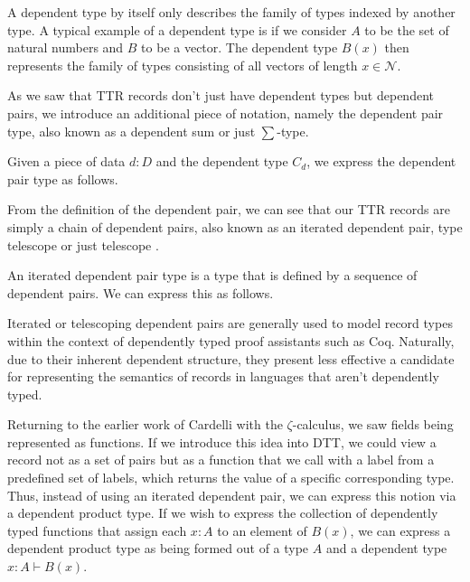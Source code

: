 A dependent type by itself only describes the family of types indexed by another type. A typical example of a dependent type is if we consider $A$ to be the set of natural numbers and $B$ to be a vector. The dependent type $B(x)$ then represents the family of types consisting of all vectors of length $x\in \mathcal N$. 

As we saw that TTR records don't just have dependent types but dependent pairs, we introduce an additional piece of notation, namely the dependent pair type, also known as a dependent sum or just $\sum$-type.

\begin{definition}
 Given a piece of data $d : D$ and the dependent type $C_d$, we express the dependent pair type as follows.
   
\end{definition}

From the definition of the dependent pair, we can see that our TTR records are simply a chain of dependent pairs, also known as an iterated dependent pair, type telescope or just telescope \cite{zucker1975automath, debruijn1991telescopic}.

\begin{definition}
 An iterated dependent pair type is a type that is defined by a sequence of dependent pairs. We can express this as follows.
  
  
  
 Iterated or telescoping dependent pairs are generally used to model record types within the context of dependently typed proof assistants such as Coq. Naturally, due to their inherent dependent structure, they present less effective a candidate for representing the semantics of records in languages that aren't dependently typed.  
\end{definition}

Returning to the earlier work of Cardelli with the $\zeta$-calculus, we saw fields being represented as functions. If we introduce this idea into DTT, we could view a record not as a set of pairs but as a function that we call with a label from a predefined set of labels, which returns the value of a specific corresponding type. Thus, instead of using an iterated dependent pair, we can express this notion via a dependent product type. If we wish to express the collection of dependently typed functions that assign each $x : A$ to an element of $B(x)$, we can express a dependent product type as being formed out of a type $A$ and a dependent type $x : A \vdash B(x)$.

